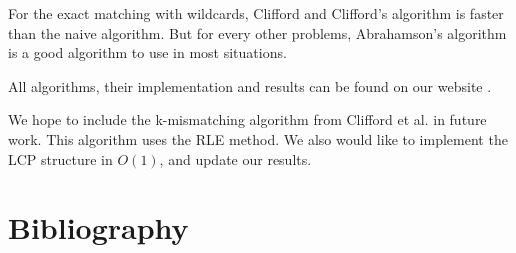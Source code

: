 \documentclass[preprint,12pt]{elsarticle}
\begin{document}
For the exact matching with wildcards, Clifford and Clifford's \cite{WC} algorithm is faster than the naive algorithm.
But for every other problems, Abrahamson's algorithm \cite{ExactHD} is a good algorithm to use
in most situations.









All algorithms, their implementation and results can be found on our website \cite{stringipedia}.


We hope to include the k-mismatching algorithm from Clifford et al. \cite{Undone} in future work.
This algorithm uses the RLE method.
We also would like to implement the LCP structure in $O(1)$,
and update our results.


\section*{Bibliography}









\end{document}
